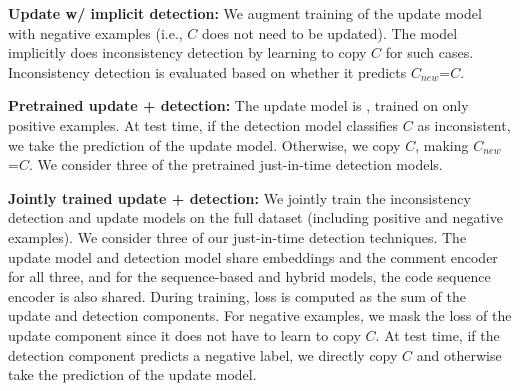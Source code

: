 \documentclass[letterpaper]{article} %
\newcommand{\Comment}{$C$}
\newcommand{\NewComment}{$C_{new}$}
\newcommand{\JustInTime}{just-in-time}
\newcommand{\UpdateCopy}{Update w/ implicit detection}
\newcommand{\Pretrained}{Pretrained update + detection}
\newcommand{\JointlyTrained}{Jointly trained update + detection}
\begin{document}
\noindent\textbf{\UpdateCopy{}:} We augment training of the update model with negative examples (i.e., \Comment{} does not need to be updated).
The model implicitly does inconsistency detection by learning to copy \Comment{} for such cases. Inconsistency detection is evaluated based on whether it predicts \NewComment{}=\Comment{}.

\noindent\textbf{\Pretrained{}:} The update model is \citet{panthaplackel2020update}, trained on only positive examples. At test time, if the detection model classifies \Comment{} as inconsistent, we take the prediction of the update model. Otherwise, we copy \Comment{}, making \NewComment{}=\Comment{}. We consider three of the pretrained \JustInTime{} detection models. 

\noindent\textbf{\JointlyTrained{}:} We jointly train the inconsistency detection and update models on the full dataset (including positive and negative examples). We consider three of our \JustInTime{} detection techniques. The update model and detection model share embeddings and the comment encoder for all three, and for the sequence-based and hybrid models, the code sequence encoder is also shared. During training, loss is computed as the sum of the update and detection components. For negative examples, we mask the loss of the update component since it does not have to learn to copy \Comment{}. At test time, if the detection component predicts a negative label, we directly copy \Comment{} and otherwise take the prediction of the update model.
\end{document}
